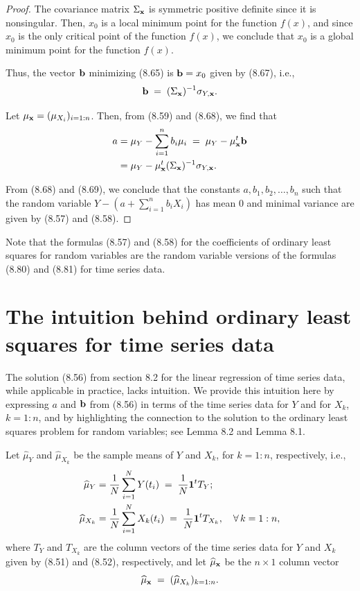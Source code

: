 \begin{proof}
The covariance matrix $\Sigma_{\mathbf{x}}$ is symmetric positive definite since it is
nonsingular. Then, $x_0$ is a local minimum point for the function $f(x)$, and since
$x_0$ is the only critical point of the function $f(x)$, we conclude that $x_0$ is a
global minimum point for the function $f(x)$.

Thus, the vector $\mathbf{b}$ minimizing (8.65) is $\mathbf{b} = x_0$ given by (8.67), i.e.,
\begin{equation}
\mathbf{b} \;=\; (\Sigma_{\mathbf{x}})^{-1}\sigma_{Y,\mathbf{x}}.
\end{equation}

Let $\mu_{\mathbf{x}} = (\mu_{X_i})_{i=1:n}$. Then, from (8.59) and (8.68), we find that
\begin{align}
a &= \mu_Y - \sum_{i=1}^n b_i\mu_i \;=\; \mu_Y - \mu_{\mathbf{x}}^t\mathbf{b} \notag\\
&= \mu_Y - \mu_{\mathbf{x}}^t(\Sigma_{\mathbf{x}})^{-1}\sigma_{Y,\mathbf{x}}.
\end{align}

From (8.68) and (8.69), we conclude that the constants $a, b_1, b_2, \ldots, b_n$ such
that the random variable $Y - \left(a+\sum_{i=1}^n b_iX_i\right)$ has mean $0$ and
minimal variance are given by (8.57) and (8.58).
\end{proof}

Note that the formulas (8.57) and (8.58) for the coefficients of ordinary least squares
for random variables are the random variable versions of the formulas (8.80) and (8.81)
for time series data.

\section{The intuition behind ordinary least squares for time series data}

The solution (8.56) from section 8.2 for the linear regression of time series data,
while applicable in practice, lacks intuition. We provide this intuition here by
expressing $a$ and $\mathbf{b}$ from (8.56) in terms of the time series data for $Y$ and for
$X_k$, $k=1:n$, and by highlighting the connection to the solution to the ordinary least
squares problem for random variables; see Lemma 8.2 and Lemma 8.1.

Let $\widehat\mu_Y$ and $\widehat\mu_{X_k}$ be the sample means of $Y$ and $X_k$, for
$k=1:n$, respectively, i.e.,
\begin{align}
\widehat\mu_Y &= \frac1N\sum_{i=1}^N Y(t_i) \;=\; \frac1N\mathbf{1}^tT_Y;\\
\widehat\mu_{X_k} &= \frac1N\sum_{i=1}^N X_k(t_i) \;=\; \frac1N\mathbf{1}^tT_{X_k}, \quad
\forall\,k=1:n,
\end{align}
where $T_Y$ and $T_{X_k}$ are the column vectors of the time series data for $Y$ and
$X_k$ given by (8.51) and (8.52), respectively, and let $\widehat\mu_{\mathbf{x}}$ be the
$n\times1$ column vector
\begin{equation}
\widehat\mu_{\mathbf{x}} \;=\; (\widehat\mu_{X_k})_{k=1:n}.
\end{equation}
